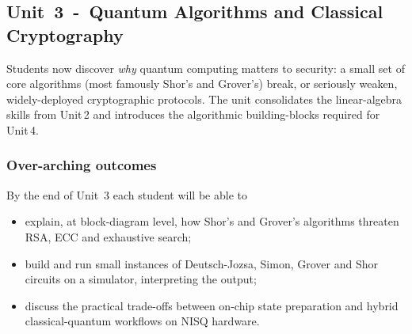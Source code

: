 \subsection*{Unit 3 - Quantum Algorithms and Classical Cryptography}

Students now discover \emph{why} quantum computing matters to security:
a small set of core algorithms (most famously Shor’s and Grover’s) break,
or seriously weaken, widely-deployed cryptographic protocols.  
The unit consolidates the linear-algebra skills from Unit\,2 
and introduces the algorithmic building-blocks required for Unit\,4.


\subsubsection*{Over-arching outcomes}
By the end of Unit~3 each student will be able to
\begin{itemize}
	\item explain, at block-diagram level, how Shor’s and Grover’s algorithms threaten RSA, ECC and exhaustive search;
	\item build and run small instances of Deutsch-Jozsa, Simon, Grover and Shor circuits on a simulator, 
	interpreting the output;
	\item discuss the practical trade-offs between on-chip state preparation 
	and hybrid classical-quantum workflows on NISQ hardware.
\end{itemize}



